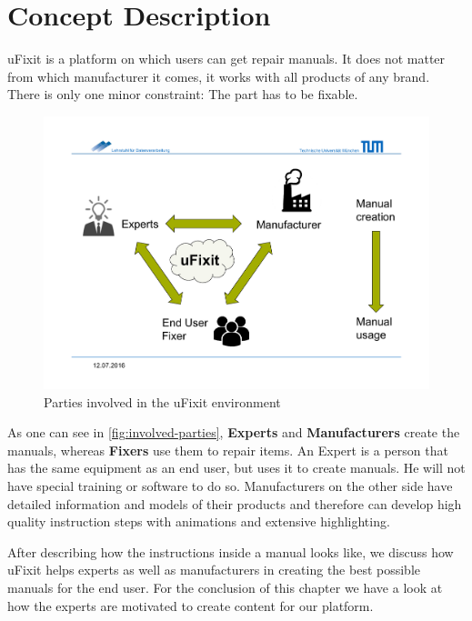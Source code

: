 
\chapter{Concept Description}

	uFixit is a platform on which users can get repair manuals. It does not matter from which manufacturer it comes, it works with all products of any brand. There is only one minor constraint: The part has to be fixable.

	\begin{figure}[H]
		\includegraphics[width=\textwidth, trim=0cm 3cm 0cm 4cm, clip]{../images/involved-parties.pdf}
		\centering
		\caption{Parties involved in the uFixit environment}
		\label{fig:involved-parties}
	\end{figure}

	As one can see in \autoref{fig:involved-parties}, \textbf{Experts} and \textbf{Manufacturers} create the manuals, whereas \textbf{Fixers} use them to repair items. An Expert is a person that has the same equipment as an end user, but uses it to create manuals. He will not have special training or software to do so. Manufacturers on the other side have detailed information and models of their products and therefore can develop high quality instruction steps with animations and extensive highlighting.
	
	After describing how the instructions inside a manual looks like, we discuss how uFixit helps experts as well as manufacturers in creating the best possible manuals for the end user. For the conclusion of this chapter we have a look at how the experts are motivated to create content for our platform.



